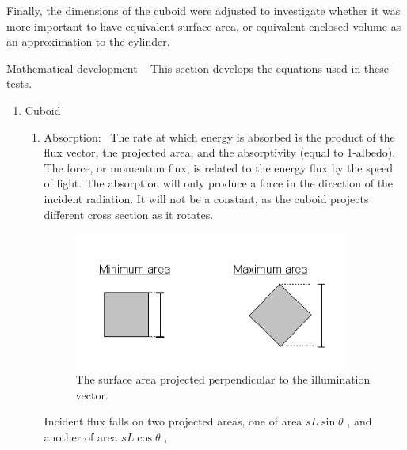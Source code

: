 \begin{description}
    Finally, the dimensions of the cuboid were adjusted to investigate whether
    it was more important to have equivalent surface area, or equivalent
    enclosed volume as an approximation to the cylinder.

   \item{Mathematical development} \ \newline
     This section develops the equations used in these tests.

     \begin{enumerate}
     \item{Cuboid}
       \begin{enumerate}
         \item{Absorption:}\ \newline
           The rate at which energy is absorbed is the product of the flux
           vector, the projected area, and the absorptivity (equal to 1-albedo).
           The force, or momentum flux, is related to the energy flux by the
           speed of light.  The
           absorption will only produce a force in the direction of the incident
           radiation.  It will not be a constant, as the cuboid projects
           different cross section as it rotates.
           \begin{figure}[!ht]
             \begin{center}
             \includegraphics[width=90mm]{figs/isoth_app/iso_app_figs3.jpg}
             \end{center}
             \caption{The surface area projected perpendicular to the
                illumination vector.}
             \label{fig:ivv_isotherm_fig3}
           \end{figure}

           Incident flux falls on two projected areas, one of area
           $sL\sin \theta $ , and another of area $sL\cos \theta $ ,


\end{enumerate}
\end{enumerate}
\end{description}
